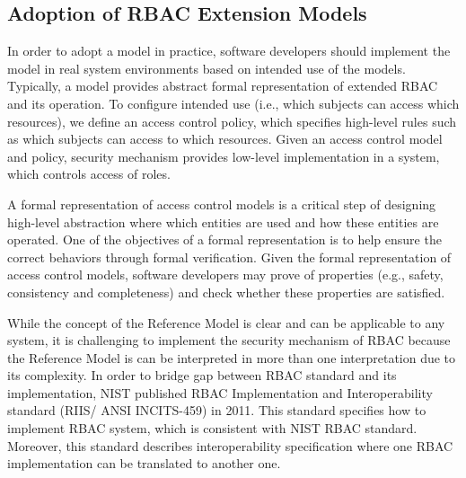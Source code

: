\subsection{Adoption of RBAC Extension Models}

In order to adopt a model in practice, software developers should implement the model in real system environments based on intended use of the models. Typically, a model provides abstract formal representation of extended RBAC and its operation. To configure intended use (i.e., which subjects can access which resources), we define an access control policy, which specifies high-level rules such as which subjects can access to which resources. Given an access control model and policy, security mechanism provides low-level implementation in a system, which controls access of roles.

A formal representation of access control models is a critical step of designing high-level abstraction where which entities are used and how these entities are operated.
One of the objectives of a formal representation is to help ensure the correct behaviors through formal verification. Given the formal representation of access control models, software developers may prove of properties (e.g., safety, consistency and completeness) and check whether these properties are satisfied. 

While the concept of the Reference Model is clear and can be applicable to any system, it is challenging to implement the security mechanism of RBAC because the Reference Model is can be interpreted in more than one interpretation due to its complexity. In order to bridge gap between RBAC standard and its implementation, NIST published RBAC Implementation and Interoperability standard (RIIS/ ANSI INCITS-459) in 2011. This standard specifies how to implement RBAC system, which is consistent with NIST RBAC standard. Moreover, this standard describes interoperability specification where one RBAC implementation can be translated to another one.

